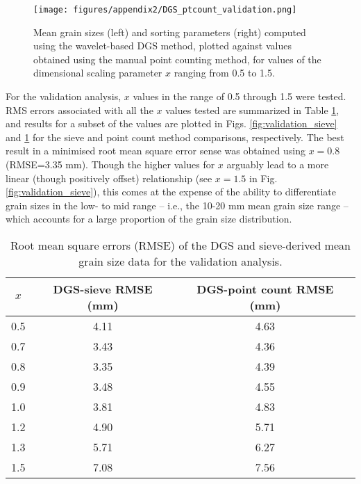 \documentclass[jmse,article,submit,pdftex,moreauthors]{Definitions/mdpi}
\begin{document}
\begin{figure}
	\texttt{[image: figures/appendix2/DGS\_ptcount\_validation.png]}
	\caption[Mean grain size and sorting: wavelet method versus manual point count]{Mean grain sizes (left) and sorting parameters (right) computed using the wavelet-based DGS method, plotted against values obtained using the manual point counting method, for values of the dimensional scaling parameter $x$ ranging from 0.5 to 1.5. \label{fig:validation_ptcount}}
\end{figure}

For the validation analysis, $x$ values in the range of 0.5 through 1.5 were tested. RMS errors associated with all the $x$ values tested are summarized in Table \ref{table:rmse}, and results for a subset of the values are plotted in Figs. \ref{fig:validation_sieve} and \ref{fig:validation_ptcount} for the sieve and point count method comparisons, respectively. The best result in a minimised root mean square error sense was obtained using $x=0.8$ (RMSE=3.35 mm). Though the higher values for $x$ arguably lead to a more linear (though positively offset) relationship (see $x=1.5$ in Fig. \ref{fig:validation_sieve}), this comes at the expense of the ability to differentiate grain sizes in the low- to mid range -- i.e., the 10-20 mm mean grain size range -- which accounts for a large proportion of the grain size distribution. %

\begin{table}[tbp!]
	\caption[RMS errors: mean grain size data from wavelet method and sieve]{Root mean square errors (RMSE) of the DGS and sieve-derived mean grain size data for the validation analysis.} 
	\label{table:rmse}
	\centering
	\begin{tabular}{ccc}
		\hline
		$x$ & DGS-sieve RMSE (mm) & DGS-point count RMSE (mm)\\
		\hline
		0.5 & 4.11 & 4.63\\
		0.7 & 3.43 & 4.36\\
		0.8 & 3.35 & 4.39\\
		0.9 & 3.48 & 4.55\\
		1.0 & 3.81 & 4.83\\
		1.2 & 4.90 & 5.71\\
		1.3 & 5.71 & 6.27\\
		1.5 & 7.08 & 7.56\\
	\end{tabular}
\end{table}
\end{document}
